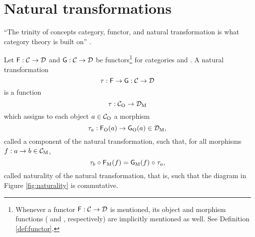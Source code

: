 \section{Natural transformations}
\label{sec:naturals}

``The trinity of concepts category, functor, and natural
transformation is what category theory is built on''
\parencite{nlab-category-theory}.

\begin{definition}
  \label{def:natural}


  Let $\mathsf{F}: \mathcal{C} \to \mathcal{D}$ and $\mathsf{G}: \mathcal{C} \to
  \mathcal{D}$ be functors\footnote{Whenever a functor $\mathsf{F}: \mathcal{C}
    \to \mathcal{D}$ is mentioned, its object and morphism functions
    ( and , respectively) are implicitly mentioned
    as well. See Definition \ref{def:functor}.} for categories 
  and . A natural transformation
  \begin{equation}
    \label{eq:natural}
    \tau: \mathsf{F} \to \mathsf{G}: \mathcal{C} \to \mathcal{D}
  \end{equation}
  is a function
  \begin{equation}
    \label{eq:natural-transformation}
    \tau: \mathcal{C}_{\operatorname{O}} \to \mathcal{D}_{\operatorname{M}}
  \end{equation}
  which assigns to each object $a \in \mathcal{C}_{\operatorname{O}}$ a morphism
  \begin{equation*}
    \tau_{a}: \mathsf{F}_{\operatorname{O}}(a) \to \mathsf{G}_{\operatorname{O}}(a) \in \mathcal{D}_{\operatorname{M}}
    \text{,}
  \end{equation*}
  called a component of the natural transformation, such that, for all
  morphisms $f: a \to b \in \mathcal{C}_{\operatorname{M}}$,
  \begin{equation}
    \label{eq:naturality}
    \tau_{b} \mathrel{\circ} \mathsf{F}_{\operatorname{M}}(f) = \mathsf{G}_{\operatorname{M}}(f) \mathrel{\circ} \tau_{a}
    \text{,}
  \end{equation}
  called naturality of the natural transformation, that is, such that
  the diagram in Figure \ref{fig:naturality} is commutative.

  \begin{figure}[htbp]
    \begin{center}
\end{center}
\end{figure}
\end{definition}
